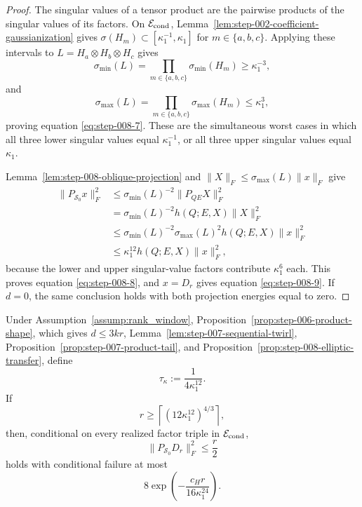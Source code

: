 \begin{proof}
The singular values of a tensor product are the
pairwise products of the singular values of its factors. On
\(\mathcal E_{\rm cond}\),
Lemma~\ref{lem:step-002-coefficient-gaussianization} gives
\(\sigma(H_m)\subset[\kappa_1^{-1},\kappa_1]\) for
\(m\in\{a,b,c\}\). Applying these intervals to
\(L=H_a\otimes H_b\otimes H_c\) gives
\[
  \sigma_{\min}(L)
  =\prod_{m\in\{a,b,c\}}\sigma_{\min}(H_m)
  \ge\kappa_1^{-3},
\]
and
\[
  \sigma_{\max}(L)
  =\prod_{m\in\{a,b,c\}}\sigma_{\max}(H_m)
  \le\kappa_1^3,
\]
proving equation \eqref{eq:step-008-7}. These are the simultaneous worst cases in which all
three lower singular values equal \(\kappa_1^{-1}\), or all three upper
singular values equal \(\kappa_1\).

Lemma~\ref{lem:step-008-oblique-projection} and
\(\|X\|_F\le\sigma_{\max}(L)\|x\|_F\) give
\begin{equation}
\begin{aligned}
  \|P_{\mathscr S_0}x\|_F^2
  &\le\sigma_{\min}(L)^{-2}\|P_{QE}X\|_F^2\\
  &=\sigma_{\min}(L)^{-2}h(Q;E,X)\|X\|_F^2\\
  &\le\sigma_{\min}(L)^{-2}\sigma_{\max}(L)^2
       h(Q;E,X)\|x\|_F^2\\
  &\le\kappa_1^{12}h(Q;E,X)\|x\|_F^2,
\end{aligned}\label{eq:step-008-10}
\end{equation}
because the lower and upper singular-value factors contribute
\(\kappa_1^6\) each. This proves equation \eqref{eq:step-008-8}, and \(x=D_r\) gives equation
\eqref{eq:step-008-9}. If \(d=0\), the same conclusion holds with both projection energies
equal to zero. 

\end{proof}


\begin{proposition}
\label{prop:step-008-raw-leverage}
Under Assumption~\ref{assump:rank_window},
Proposition~\ref{prop:step-006-product-shape}, which gives
\(d\le3kr\), Lemma~\ref{lem:step-007-sequential-twirl},
Proposition~\ref{prop:step-007-product-tail}, and
Proposition~\ref{prop:step-008-elliptic-transfer}, define
\begin{equation}
  \tau_\kappa:=\frac1{4\kappa_1^{12}}.                     \label{eq:step-008-11}
\end{equation}
If
\begin{equation}
  r\ge\left\lceil(12\kappa_1^{12})^{4/3}\right\rceil,     \label{eq:step-008-12}
\end{equation}
then, conditional on every realized factor triple in
\(\mathcal E_{\rm cond}\),
\begin{equation}
  \|P_{\mathscr S_0}D_r\|_F^2\le\frac r2
  \label{eq:step-008-raw-leverage-conclusion}
\end{equation}
holds with conditional failure at most
\begin{equation}
  8\exp\!\left(-\frac{c_Hr}{16\kappa_1^{24}}\right).
                                                               \label{eq:step-008-13}
\end{equation}

\end{proposition}

